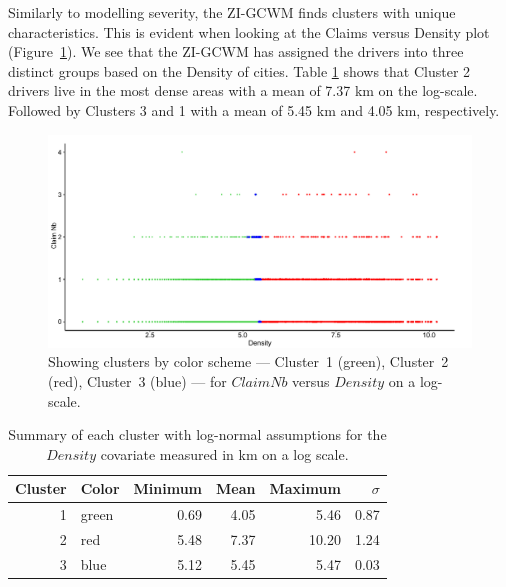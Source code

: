 \documentclass[12pt,letterpaper]{article}
\numberwithin{equation}{section}
\numberwithin{equation}{section}
\numberwithin{equation}{section}
\begin{document}
Similarly to modelling severity, the ZI-GCWM finds clusters with unique characteristics. This is evident when looking at the Claims versus Density plot (Figure~\ref{frequencyGraph}). We see that the ZI-GCWM has assigned the drivers into three distinct groups based on the Density of cities. Table \ref{summarycovariates} shows that Cluster 2 drivers live in the most dense areas with a mean of 7.37 km on the log-scale. Followed by Clusters 3 and 1 with a mean of 5.45 km and 4.05 km, respectively.
\begin{figure}[!ht]
\begin{center}
\includegraphics[scale=0.6]{freqPlot.pdf}
\end{center}
\vspace{-0.2in}\caption{Showing clusters by color scheme --- Cluster~1 (green), Cluster~2 (red), Cluster~3 (blue) --- for $Claim Nb$ versus $Density$ on a log-scale.}
\label{frequencyGraph}
\end{figure}
\begin{table}[!htb]
 \begin{center}
 \caption{Summary of each cluster with log-normal assumptions for the $Density$ covariate measured in km on a log scale.} \label{summarycovariates}
\begin{tabular}{rlrrrr}
\hline
Cluster  & Color & Minimum & Mean & Maximum & $\sigma$  \\
\hline
1       & green  & 0.69 & 4.05 & 5.46  & 0.87 \\
2       & red    & 5.48 & 7.37 & 10.20 & 1.24 \\
3       & blue   & 5.12 & 5.45 & 5.47  & 0.03 \\
\hline
\end{tabular}
\end{center}
\end{table}
\end{document}
